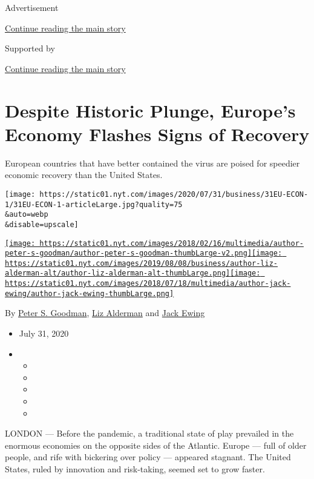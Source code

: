 Advertisement

\protect\hyperlink{after-top}{Continue reading the main story}

Supported by

\protect\hyperlink{after-sponsor}{Continue reading the main story}

\hypertarget{despite-historic-plunge-europes-economy-flashes-signs-of-recovery}{%
\section{Despite Historic Plunge, Europe's Economy Flashes Signs of
Recovery}\label{despite-historic-plunge-europes-economy-flashes-signs-of-recovery}}

European countries that have better contained the virus are poised for
speedier economic recovery than the United States.

\texttt{[image: https://static01.nyt.com/images/2020/07/31/business/31EU-ECON-1/31EU-ECON-1-articleLarge.jpg?quality=75\\\&auto=webp\\\&disable=upscale]}

\href{https://www.nytimes.com/by/peter-s-goodman}{\texttt{[image: https://static01.nyt.com/images/2018/02/16/multimedia/author-peter-s-goodman/author-peter-s-goodman-thumbLarge-v2.png]}}\href{https://www.nytimes.com/by/liz-alderman}{\texttt{[image: https://static01.nyt.com/images/2019/08/08/business/author-liz-alderman-alt/author-liz-alderman-alt-thumbLarge.png]}}\href{https://www.nytimes.com/by/jack-ewing}{\texttt{[image: https://static01.nyt.com/images/2018/07/18/multimedia/author-jack-ewing/author-jack-ewing-thumbLarge.png]}}

By \href{https://www.nytimes.com/by/peter-s-goodman}{Peter S. Goodman},
\href{https://www.nytimes.com/by/liz-alderman}{Liz Alderman} and
\href{https://www.nytimes.com/by/jack-ewing}{Jack Ewing}

\begin{itemize}
\item
  July 31, 2020
\item
  \begin{itemize}
  \item
  \item
  \item
  \item
  \item
  \end{itemize}
\end{itemize}

LONDON --- Before the pandemic, a traditional state of play prevailed in
the enormous economies on the opposite sides of the Atlantic. Europe ---
full of older people, and rife with bickering over policy --- appeared
stagnant. The United States, ruled by innovation and risk-taking, seemed
set to grow faster.

